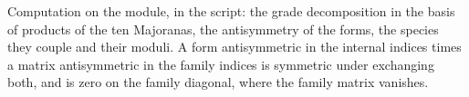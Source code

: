 Computation on the module, in the script: the grade decomposition in the basis of products of the ten Majoranas, the antisymmetry of the forms, the species they couple and their moduli. A form antisymmetric in the internal indices times a matrix antisymmetric in the family indices is symmetric under exchanging both, and is zero on the family diagonal, where the family matrix vanishes.
